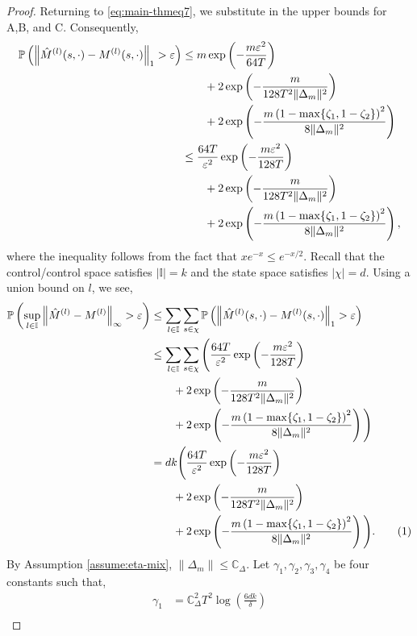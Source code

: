 \documentclass[opre,sglanonrev]{informs4}
\numberwithin{equation}{section}
\newcommand{\lp}{\left(}
\newcommand{\rp}{\right)}
\newcommand{\Cbb}{\mathbb{C}}
\newcommand{\Ibb}{\mathbb{I}}
\newcommand{\Pbb}{\mathbb{P}}
\newcommand{\constant}{\Cbb}
\newcommand{\hatmls}{\Hat{M}^{(l)}(s,\cdot)}
\newcommand{\mls}{{M}^{(l)}(s,\cdot)}
\newcommand\numberthis{\addtocounter{equation}{1}\tag{\theequation}}
\newcommand{\prob}{\Pbb}
\newcommand{\eps}{\varepsilon}
\renewcommand{\epsilon}{\eps}
\begin{document}
\begin{APPENDICES}
\begin{proof}
Returning to \cref{eq:main-thmeq7}, we substitute in the upper bounds for A,B, and C.
Consequently, 
\begin{align*}
     \prob \left(\left\|\hatmls-\mls\right\|_1 > \epsilon\right) & \leq  m\exp\left({-\frac{m\epsilon^2}{64T}} \right)\\
     &\qquad +2 \exp\left({-{\frac{m}{128T^2\|\Delta_{m}\|^2}}}\right)\\
     & \qquad +2 \exp\left({-{\frac{m\lp1-\max\{\zeta_1,1-\zeta_2\}\rp^2}{8\|\Delta_{m}\|^2}}}\right)\\
     & \leq  \frac{64T}{\eps^2}\exp\left({-\frac{m\epsilon^2}{128T}} \right)\\
     &\qquad +2 \exp\left({-{\frac{m}{128T^2\|\Delta_{m}\|^2}}}\right)\\
     & \qquad +2 \exp\left({-{\frac{m\lp1-\max\{\zeta_1,1-\zeta_2\}\rp^2}{8\|\Delta_{m}\|^2}}}\right),
\end{align*}
where the inequality follows from the fact that $xe^{-x}\leq e^{-x/2}$.
Recall that the control/control space satisfies $|\Ibb| = k$ and the state space satisfies $|\chi|=d$. Using a union bound on $l$, we see,
\begin{align*}
     \prob\left(\underset{l\in \Ibb}{\sup} \left\|\Hat{M}^{(l)}-M^{(l)} \right\|_{\infty}>\epsilon  \right) & \leq \sum_{l\in\Ibb}\sum_{s\in \chi} \prob\lp\left\|\hatmls-\mls \right\|_1 > \epsilon\rp\\
    & \leq \sum_{l\in\Ibb}\sum_{s\in \chi}\Bigg(  \frac{64T}{\eps^2}\exp\left({-\frac{m\epsilon^2}{128T}} \right)\\
    &\qquad +2 \exp\left({-{\frac{m}{128T^2\|\Delta_{m}\|^2}}}\right)\\
    & \qquad +2 \exp\left({-{\frac{m\lp1-\max\{\zeta_1,1-\zeta_2\}\rp^2}{8\|\Delta_{m}\|^2}}}\right)\Bigg)\\
    & = dk\Bigg( \frac{64T}{\eps^2} \exp\left({-\frac{m\epsilon^2}{128T}} \right)\\
    &\qquad +2 \exp\left({-{\frac{m}{128T^2\|\Delta_{m}\|^2}}}\right)\\
    & \qquad +2 \exp\left({-{\frac{m\lp1-\max\{\zeta_1,1-\zeta_2\}\rp^2}{8\|\Delta_{m}\|^2}}}\right)\Bigg).\numberthis\label{eq:main-thmeq9}
\end{align*}
\noindent By Assumption \ref{assume:eta-mix}, $\|\Delta_m\|\leq \constant_\Delta$.
Let $\gamma_1,\gamma_2,\gamma_3,\gamma_4$ be four constants such that,
\begin{align*}
    \gamma_1 & = \constant_\Delta^2T^2\log\lp \frac{6dk}{\delta} \rp\\

\end{align*}
\end{proof}
\end{APPENDICES}
\end{document}
